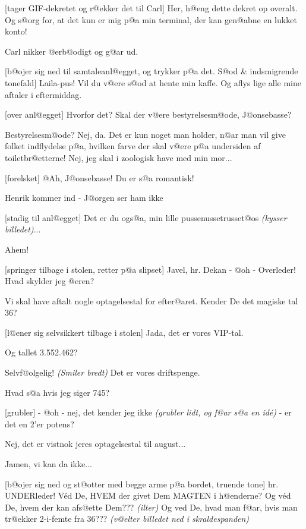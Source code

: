 \documentclass[a4paper,11pt]{article}
\begin{document}
\begin{sketch}
[tager GIF-dekretet og r@ekker det til Carl] Her,
h@eng dette dekret op overalt. Og s@org for, at det kun er mig p@a
min terminal, der kan gen@abne en lukket konto!

\scene Carl nikker @erb@odigt og g@ar ud.

[b@ojer sig ned til samtaleanl@egget, og trykker
p@a det. S@od \& indsmigrende tonefald] Laila-pus! Vil du v@ere s@od
at hente min kaffe. Og aflys lige alle mine aftaler i eftermiddag.

[over anl@egget] Hvorfor det? Skal der v@ere
bestyrelsesm@ode, J@onsebasse?

 Bestyrelsesm@ode? Nej, da. Det er kun noget man
holder, n@ar man vil give folket indflydelse p@a, hvilken farve der
skal v@ere p@a undersiden af toiletbr@etterne! Nej, jeg skal i
zoologisk have med min mor...

[forelsket] @Ah, J@onsebasse! Du er s@a romantisk!

\scene Henrik kommer ind - J@orgen ser ham ikke

[stadig til anl@egget] Det er du ogs@a, min lille
pussenussetrusset@os {\em (kysser billedet)}...

 Ahem!

[springer tilbage i stolen, retter p@a slipset]
Javel, hr. Dekan - @oh - Overleder! Hvad skylder jeg @eren?

 Vi skal have aftalt nogle optagelsestal for efter@aret.
Kender De det magiske tal 36?

[l@ener sig selvsikkert tilbage i stolen] Jada, det er vores VIP-tal.

 Og tallet 3.552.462?

 Selvf@olgelig! {\em (Smiler bredt)} Det er vores
driftspenge.

 Hvad s@a hvis jeg siger 745?

[grubler] - @oh - nej, det kender jeg ikke {\em
(grubler lidt, og f@ar s@a en id\'e)} - er det en 2'er potens?

 Nej, det er vistnok jeres optagelsestal til august...

 Jamen, vi kan da ikke...

[b@ojer sig ned og st@otter med begge arme p@a bordet,
truende tone] hr. UNDERleder! V\'ed De, HVEM der givet Dem MAGTEN i
h@enderne? Og v\'ed De, hvem der kan afs@ette Dem???  {\em (ilter)}
Og ved De, hvad man f@ar, hvis man tr@ekker 2-i-femte fra 36??? {\em
(v@elter billedet ned i skraldespanden)}


\end{sketch}
\end{document}
